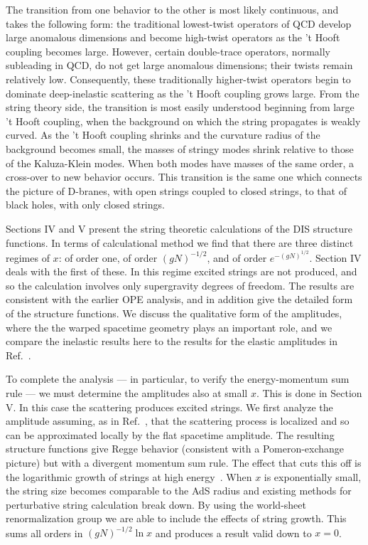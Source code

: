 The transition from one behavior to the other is most
likely continuous,
and takes the following form: the traditional lowest-twist
operators of QCD develop large anomalous dimensions and become
high-twist operators as the 't Hooft coupling becomes large.  However,
certain double-trace operators, normally subleading in QCD, do not get
large anomalous dimensions; their twists remain relatively low.
Consequently, these traditionally higher-twist operators begin to
dominate deep-inelastic scattering as the 't Hooft coupling grows
large.  From the string theory side, the transition is most easily
understood beginning from large 't Hooft coupling, when the background
on which the string propagates is weakly curved. As the 't Hooft
coupling shrinks and the curvature radius of the background becomes
small, the masses of stringy modes shrink relative to those of the
Kaluza-Klein modes.  When both modes have masses of the same order, a
cross-over to new behavior occurs.  This
transition is the same one which connects the picture of
D-branes, with open strings coupled to closed strings, to that of
black holes, with only closed strings.

Sections IV and V present the string theoretic calculations of the DIS
structure functions.  In terms of calculational method we find that
there are three distinct regimes of $x$: of order one, of order
$(gN)^{-1/2}$, and of order $e^{-(gN)^{1/2}}$.  Section IV deals with
the first of these.  In this regime excited strings are not produced,
and so the calculation involves only supergravity degrees of freedom.
The results are consistent with the earlier OPE analysis, and in
addition give the detailed form of the structure functions.  We
discuss the qualitative form of the amplitudes, where the the warped
spacetime geometry plays an important role, and we compare the
inelastic results here to the results for the elastic amplitudes in
Ref.~\cite{PShard}.

To complete the analysis --- in particular, to verify the
energy-momentum sum rule --- we must determine the amplitudes also at
small $x$.  This is done in Section \mbox{V}.  In this case the
scattering produces excited strings.  We first analyze the amplitude
assuming, as in Ref.~\cite{PShard}, that the scattering process is
localized and so can be approximated locally by the flat spacetime
amplitude.  The resulting structure functions give Regge behavior (consistent
with a Pomeron-exchange picture) but with a divergent momentum
sum rule.  The effect that cuts this off is the logarithmic growth of
strings at high energy~\cite{growth}.  When $x$ is exponentially
small, the string size becomes comparable to the AdS radius and
existing methods for perturbative string calculation break down.  By
using the world-sheet renormalization group we are able to include the
effects of string growth.  This sums all orders in $(gN)^{-1/2} \ln x$
and produces a result valid down to $x = 0$.

